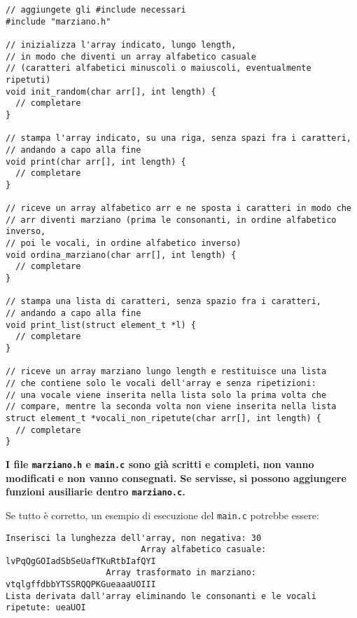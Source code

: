 \documentclass[12pt]{article}
\begin{document}
\begin{center}
  \begin{lstlisting}[language=myC]
// aggiungete gli #include necessari
#include "marziano.h"

// inizializza l'array indicato, lungo length,
// in modo che diventi un array alfabetico casuale
// (caratteri alfabetici minuscoli o maiuscoli, eventualmente ripetuti)
void init_random(char arr[], int length) {
  // completare
}

// stampa l'array indicato, su una riga, senza spazi fra i caratteri,
// andando a capo alla fine
void print(char arr[], int length) {
  // completare
}

// riceve un array alfabetico arr e ne sposta i caratteri in modo che
// arr diventi marziano (prima le consonanti, in ordine alfabetico inverso,
// poi le vocali, in ordine alfabetico inverso)
void ordina_marziano(char arr[], int length) {
  // completare
}

// stampa una lista di caratteri, senza spazio fra i caratteri,
// andando a capo alla fine
void print_list(struct element_t *l) {
  // completare
}

// riceve un array marziano lungo length e restituisce una lista
// che contiene solo le vocali dell'array e senza ripetizioni:
// una vocale viene inserita nella lista solo la prima volta che
// compare, mentre la seconda volta non viene inserita nella lista
struct element_t *vocali_non_ripetute(char arr[], int length) {
  // completare
}
  \end{lstlisting}
\end{center}

\begin{mdframed}[backgroundcolor=lightred] 
  \textbf{I file \texttt{marziano.h} e \texttt{main.c} sono gi\`a scritti e completi, non vanno modificati e non vanno consegnati. Se servisse, si possono aggiungere funzioni ausiliarie dentro \texttt{marziano.c}.}
\end{mdframed}

\vspace*{5ex}
Se tutto \`e corretto,
un esempio di esecuzione del \texttt{main.c} potrebbe essere:

\begin{mdframed}[backgroundcolor=verylightgray] 
\begin{verbatim}
Inserisci la lunghezza dell'array, non negativa: 30
                           Array alfabetico casuale: lvPqQgGOIadSbSeUafTKuRtbIafQYI
                    Array trasformato in marziano: vtqlgffdbbYTSSRQQPKGueaaaUOIII
Lista derivata dall'array eliminando le consonanti e le vocali ripetute: ueaUOI

\end{verbatim}
\end{mdframed}
\end{document}
